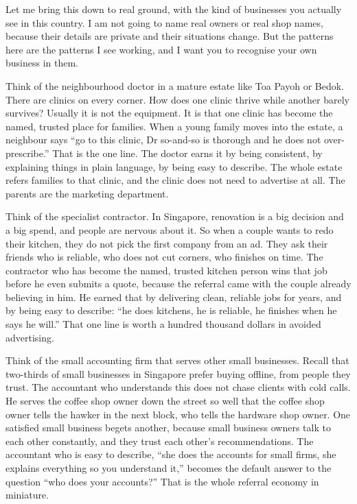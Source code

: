 \documentclass[10pt,twoside,openany]{memoir}
\begin{document}
{Let me bring this down to real ground, with the kind of businesses you
actually see in this country. I am not going to name real owners or real
shop names, because their details are private and their situations
change. But the patterns here are the patterns I see working, and I want
you to recognise your own business in them.

Think of the neighbourhood doctor in a mature estate like Toa Payoh or
Bedok. There are clinics on every corner. How does one clinic thrive
while another barely survives? Usually it is not the equipment. It is
that one clinic has become the named, trusted place for families. When a
young family moves into the estate, a neighbour says ``go to this
clinic, Dr so-and-so is thorough and he does not over-prescribe.'' That
is the one line. The doctor earns it by being consistent, by explaining
things in plain language, by being easy to describe. The whole estate
refers families to that clinic, and the clinic does not need to
advertise at all. The parents are the marketing department.

Think of the specialist contractor. In Singapore, renovation is a big
decision and a big spend, and people are nervous about it. So when a
couple wants to redo their kitchen, they do not pick the first company
from an ad. They ask their friends who is reliable, who does not cut
corners, who finishes on time. The contractor who has become the named,
trusted kitchen person wins that job before he even submits a quote,
because the referral came with the couple already believing in him. He
earned that by delivering clean, reliable jobs for years, and by being
easy to describe: ``he does kitchens, he is reliable, he finishes when
he says he will.'' That one line is worth a hundred thousand dollars in
avoided advertising.

Think of the small accounting firm that serves other small businesses.
Recall that two-thirds of small businesses in Singapore prefer buying
offline, from people they trust. The accountant who understands this
does not chase clients with cold calls. He serves the coffee shop owner
down the street so well that the coffee shop owner tells the hawker in
the next block, who tells the hardware shop owner. One satisfied small
business begets another, because small business owners talk to each
other constantly, and they trust each other's recommendations. The
accountant who is easy to describe, ``she does the accounts for small
firms, she explains everything so you understand it,'' becomes the
default answer to the question ``who does your accounts?'' That is the
whole referral economy in miniature.

}
\end{document}
